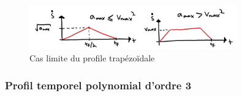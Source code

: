 \begin{figure}[ht]
	\centering
		\includegraphics[width=0.80\textwidth]{fig/trap_profile_triangle.jpg}
	\caption{Cas limite du profile trapézoïdale}
	\label{fig:trap_profile_triangle}
\end{figure}





\subsubsection{Profil temporel polynomial d'ordre 3}

